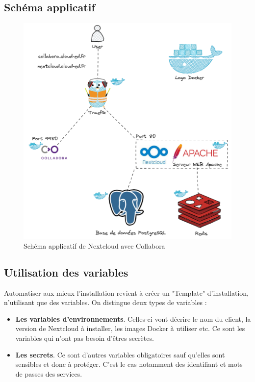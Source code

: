 \documentclass[12pt, a4paper, twoside]{article}
\begin{document}
\newpage
\subsection{Schéma applicatif}
\begin{figure}[!ht]
    \centering
    \includegraphics[width=\textwidth]{src/graph_nextcloud.png}
    \caption{Schéma applicatif de \gls{Nextcloud} avec \gls{Collabora}}
    \label{fig:nextcloudXcollabora}
\end{figure}

\newpage
\subsection{Utilisation des variables}
Automatiser aux mieux l'installation revient à créer un "Template" d'installation, n'utilisant que des variables. 
On distingue deux types de variables :
\begin{itemize}
    \item \textbf{Les variables d'environnements}. Celles-ci vont décrire le nom du client, la version de \gls{Nextcloud} à installer, les images Docker à utiliser etc. 
    Ce sont les variables qui n'ont pas besoin d'êtres secrètes.
    \item \textbf{Les secrets}. Ce sont d'autres variables obligatoires sauf qu'elles sont sensibles et donc à protéger. 
    C'est le cas notamment des identifiant et mots de passes des services.
\end{itemize}
\end{document}
